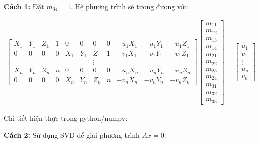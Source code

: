 \documentclass[11pt]{article}
\begin{document}
\textbf{Cách 1:} Đặt $m_{34}=1$. Hệ phương trình sẽ tương đương với:

\begin{align*}
    \begin{bmatrix}
        X_1 & Y_1 & Z_1 & 1 & 0 & 0 & 0 & 0 & -u_1X_1 & -u_1Y_1 & -u_1Z_1 \\
        0 & 0 & 0 & 0 & X_1 & Y_1 & Z_1 & 1 & -v_1X_1 & -v_1Y_1 & -v_1Z_1 \\
         &  &  &  &  &  & \vdots &  &  &  &  \\
        X_n & Y_n & Z_n & n & 0 & 0 & 0 & 0 & -u_nX_n & -u_nY_n & -u_nZ_n \\
        0 & 0 & 0 & 0 & X_n & Y_n & Z_n & n & -v_nX_n & -v_nY_n & -v_nZ_n
    \end{bmatrix}
    \begin{bmatrix}
        m_{11} \\
        m_{12} \\
        m_{13} \\
        m_{14} \\
        m_{21} \\
        m_{22} \\
        m_{23} \\
        m_{24} \\
        m_{31} \\
        m_{32} \\
        m_{33}
    \end{bmatrix}
    = 
    \begin{bmatrix}
        u_1 \\
        v_1 \\
        \vdots \\
        u_n \\
        v_n 
    \end{bmatrix}
\end{align*}

Chi tiết hiện thực trong python/numpy:

\textbf{Cách 2:} Sử dụng SVD để giải phương trình $Ax=0$:
\end{document}
